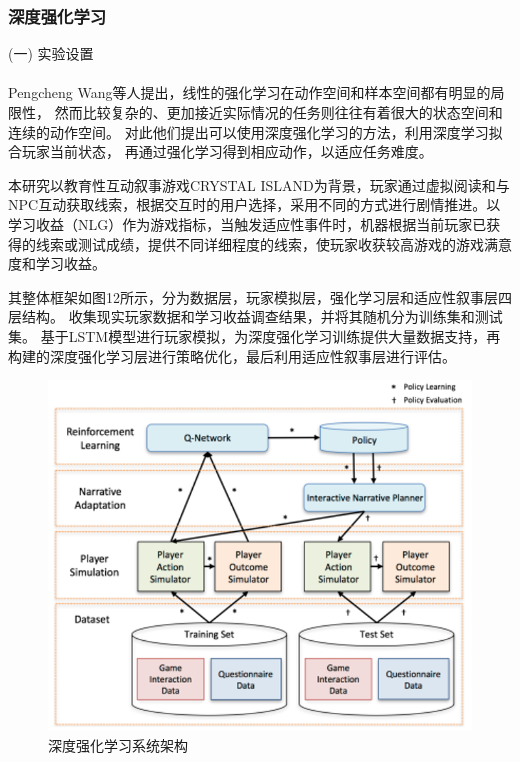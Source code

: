 \documentclass[12pt]{article}
\begin{document}
            \subsubsection{深度强化学习}
            (一) 实验设置\paragraph{}
            Pengcheng Wang\cite{ref15}等人提出，线性的强化学习在动作空间和样本空间都有明显的局限性，
            然而比较复杂的、更加接近实际情况的任务则往往有着很大的状态空间和连续的动作空间。
            对此他们提出可以使用深度强化学习的方法，利用深度学习拟合玩家当前状态，
            再通过强化学习得到相应动作，以适应任务难度。

            本研究以教育性互动叙事游戏CRYSTAL ISLAND为背景，玩家通过虚拟阅读和与NPC互动获取线索，根据交互时的用户选择，采用不同的方式进行剧情推进。以学习收益（NLG）作为游戏指标，当触发适应性事件时，机器根据当前玩家已获得的线索或测试成绩，提供不同详细程度的线索，使玩家收获较高游戏的游戏满意度和学习收益。
            
            其整体框架如图12所示，分为数据层，玩家模拟层，强化学习层和适应性叙事层四层结构。
            收集现实玩家数据和学习收益调查结果，并将其随机分为训练集和测试集。
            基于LSTM模型进行玩家模拟，为深度强化学习训练提供大量数据支持，再构建的深度强化学习层进行策略优化，最后利用适应性叙事层进行评估。
            \begin{figure}[H]
            	
            	\centering
            	\includegraphics[scale=0.7]{images/RL_architecture.png}
            	\caption{深度强化学习系统架构}
            	\label{fig:label}
            \end{figure}
\end{document}
